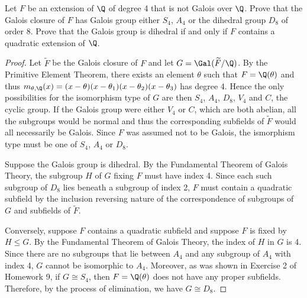 \documentclass[10pt]{amsart}
\begin{document}
\begin{thm}
  \label{Ex3}
  Let $F$ be an extension of $\Q$ of degree 4 that is not Galois over $\Q$.
  Prove that the Galois closure of $F$ has Galois group either $S_4$, $A_4$ or the dihedral group $D_8$ of order 8.
  Prove that the Galois group is dihedral if and only if $F$ contains a quadratic extension of $\Q$.
  
  \begin{proof}
    Let $\widetilde{F}$ be the Galois closure of $F$ and let $G = \Gal(\widetilde{F}/\Q)$.
    By the Primitive Element Theorem, there exists an element $\theta$ such that $F = \Q(\theta)$ and thus $m_{\theta,\Q}(x) = (x - \theta)(x - \theta_1)(x-\theta_2)(x-\theta_3)$ has degree 4.
    Hence the only possibilities for the isomorphism type of $G$ are then $S_4$, $A_4$, $D_8$, $V_4$ and $C$, the cyclic group.
    If the Galois group were either $V_4$ or $C$, which are both abelian, all the subgroups would be normal and thus the corresponding subfields of $\widetilde{F}$ would all necessarily be Galois.
    Since $F$ was assumed not to be Galois, the ismorphism type must be one of $S_4$, $A_4$ or $D_8$.
    
    Suppose the Galois group is dihedral.
    By the Fundamental Theorem of Galois Theory, the subgroup $H$ of $G$ fixing $F$ must have index 4.
    Since each such subgroup of $D_8$ lies beneath a subgroup of index 2, $F$ must contain a quadratic subfield by the inclusion reversing nature of the correspondence of subgroups of $G$ and subfields of $\widetilde{F}$.
    
    Conversely, suppose $F$ contains a quadratic subfield and suppose $F$ is fixed by $H \leq G$.
    By the Fundamental Theorem of Galois Theory, the index of $H$ in $G$ is 4.
    Since there are no subgroups that lie between $A_4$ and any subgroup of $A_4$ with index 4, $G$ cannot be isomorphic to $A_4$.
    Moreover, as was shown in Exercise 2 of Homework 9, if $G \cong S_4$, then $F = \Q(\theta)$ does not have any proper subfields.
    Therefore, by the process of elimination, we have $G \cong D_8$.
  \end{proof}
\end{thm}
\end{document}
